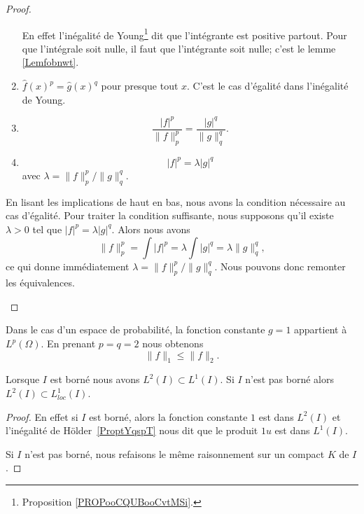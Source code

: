 \begin{proof}
\begin{subproof}
\begin{subproof}
\begin{enumerate}
				      En effet l'inégalité de Young\footnote{Proposition \ref{PROPooCQUBooCvtMSi}.} dit que l'intégrante est positive partout. Pour que l'intégrale soit nulle, il faut que l'intégrante soit nulle; c'est le lemme \ref{Lemfobnwt}.
				\item \( \hat f(x)^p=\hat g(x)^q\) pour presque tout \( x\). C'est le cas d'égalité dans l'inégalité de Young.
				\item
				      \begin{equation}
					      \frac{ | f |^p }{ \| f \|_p^p }=\frac{ | g |^q }{ \| g \|_q^q }.
				      \end{equation}
				\item
				      \begin{equation}
					      | f |^p=\lambda | g |^q
				      \end{equation}
				      avec \( \lambda=\| f \|_p^p/\| g \|_q^q\).
			\end{enumerate}
			\spitem[Conclusion]
			En lisant les implications de haut en bas, nous avons la condition nécessaire au cas d'égalité. Pour traiter la condition suffisante, nous supposons qu'il existe \( \lambda>0\) tel que \( | f |^p=\lambda| g |^q\). Alors nous avons
			\begin{equation}
				\| f \|_p^p=\int| f |^p=\lambda\int| g |^q=\lambda\| g \|_q^q,
			\end{equation}
			ce qui donne immédiatement \( \lambda=\| f \|_p^p/\| g \|_q^q\). Nous pouvons donc remonter les équivalences.
		\end{subproof}
	\end{subproof}
\end{proof}


\begin{remark}      \label{RemNormuptNird}
	Dans le cas d'un espace de probabilité, la fonction constante \( g=1\) appartient à \( L^p(\Omega)\). En prenant \( p=q=2\) nous obtenons
	\begin{equation}
		\| f \|_1\leq\| f \|_2.
	\end{equation}
\end{remark}

\begin{lemma}   \label{LemTLHwYzD}
	Lorsque \( I\) est borné nous avons \( L^2(I)\subset L^1(I)\). Si \( I\) n'est pas borné alors \( L^2(I)\subset L^1_{loc}(I)\).
\end{lemma}

\begin{proof}
	En effet si \( I\) est borné, alors la fonction constante \( 1\) est dans \( L^2(I)\) et l'inégalité de Hölder~\ref{ProptYqspT} nous dit que le produit \( 1u\) est dans \( L^1(I)\).

	Si \( I\) n'est pas borné, nous refaisons le même raisonnement sur un compact \( K\) de \( I\).
\end{proof}

